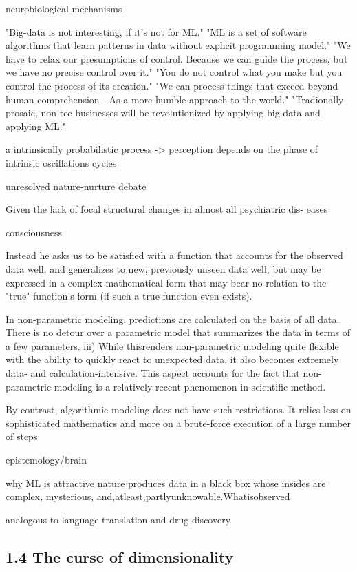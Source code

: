 \documentclass[authoryear,review,3p]{elsarticle}
\begin{document}
neurobiological mechanisms

"Big-data is not interesting, if it's not for ML."
"ML is a set of software algorithms that learn patterns in data without explicit programming model."
"We have to relax our presumptions of control. Because we can guide the process, but we have no precise control over it." "You do not control what you make but you control the process of its creation."
"We can process things that exceed beyond human comprehension - As a more humble approach to the world." "Tradionally prosaic, non-tec businesses will be revolutionized by applying big-data and applying ML."


a intrinsically probabilistic process
-> perception depends on the phase of intrinsic oscillations cycles

unresolved nature-nurture debate

Given the lack of focal structural changes in almost all psychiatric dis- eases

consciousness

Instead he asks us to be satisfied with a function that
accounts for the observed data well, and generalizes to new,
previously unseen data well, but may be expressed in a complex mathematical
form that may bear no relation to the "true" function's form
(if such a true function even exists).


In non-parametric modeling, predictions are calculated on the basis of all data. There is no detour over a parametric model that summarizes the data in terms of a few parameters. iii) While thisrenders non-parametric modeling quite flexible with the ability to quickly react to unexpected data, it also becomes extremely data- and calculation-intensive. This aspect accounts for the fact that non-parametric modeling is a relatively recent phenomenon in scientific method.

By contrast, algorithmic modeling does not have such restrictions. It relies less on sophisticated mathematics and more on a brute-force execution of a large number of steps



epistemology/brain

why ML is attractive
nature produces data in a black box whose insides are complex, mysterious, and,atleast,partlyunknowable.Whatisobserved

analogous to language translation and drug discovery



\subsection*{1.4 The curse of dimensionality}
\end{document}

